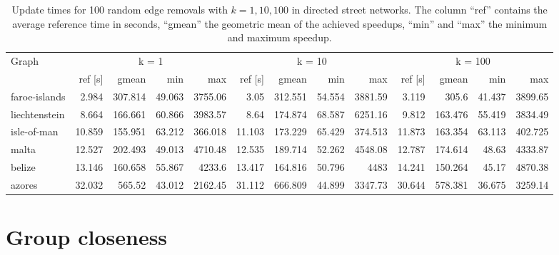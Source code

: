 \begin{landscape}
\begin{table}[h!]
\centering
\begin{tabular}{l|rrrr|rrrr|rrrr}
\toprule
Graph & \multicolumn{4}{c|}{k = 1} & \multicolumn{4}{c|}{k = 10} & \multicolumn{4}{c}{k = 100}\\
                &     ref [s] &   gmean &   min &     max &     ref [s] &   gmean &   min &     max &     ref [s] &   gmean &   min &     max \\
\midrule \midrule
 faroe-islands &  2.984 & 307.814 & 49.063 & 3755.06  &  3.05  & 312.551 & 54.554 & 3881.59  &  3.119 & 305.6   & 41.437 & 3899.65  \\
 liechtenstein &  8.664 & 166.661 & 60.866 & 3983.57  &  8.64  & 174.874 & 68.587 & 6251.16  &  9.812 & 163.476 & 55.419 & 3834.49  \\
 isle-of-man   & 10.859 & 155.951 & 63.212 &  366.018 & 11.103 & 173.229 & 65.429 &  374.513 & 11.873 & 163.354 & 63.113 &  402.725 \\
 malta         & 12.527 & 202.493 & 49.013 & 4710.48  & 12.535 & 189.714 & 52.262 & 4548.08  & 12.787 & 174.614 & 48.63  & 4333.87  \\
 belize        & 13.146 & 160.658 & 55.867 & 4233.6   & 13.417 & 164.816 & 50.796 & 4483     & 14.241 & 150.264 & 45.17  & 4870.38  \\
 azores        & 32.032 & 565.52  & 43.012 & 2162.45  & 31.112 & 666.809 & 44.899 & 3347.73  & 30.644 & 578.381 & 36.675 & 3259.14  \\
\bottomrule
\end{tabular}
\caption{Update times for 100 random edge removals with $k = 1, 10, 100$ in directed street networks. The column ``ref'' contains the average reference time in seconds, ``gmean'' the geometric mean of the achieved speedups, ``min'' and ``max'' the minimum and maximum speedup.}
\end{table}

\end{landscape}


\section{Group closeness}